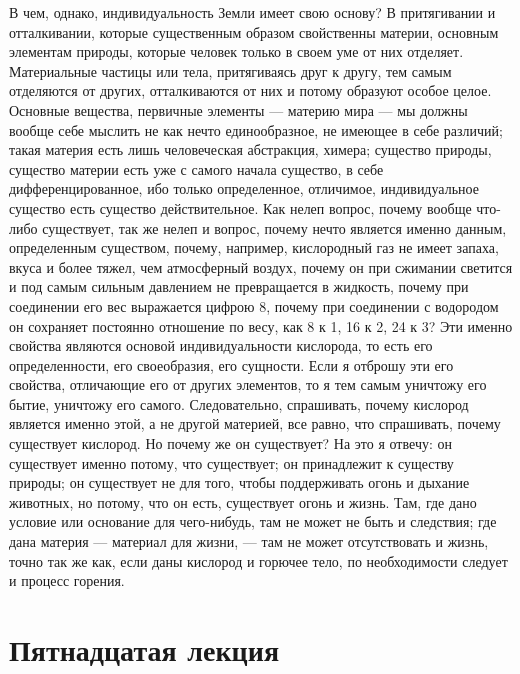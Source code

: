\documentclass[12pt]{article}
\begin{document}
В чем, однако, индивидуальность Земли имеет свою основу? В притягивании и отталкивании, которые существенным образом свойственны материи, основным элементам природы, которые человек только в своем уме от них отделяет. Материальные частицы или тела, притягиваясь друг к другу, тем самым отделяются от других, отталкиваются от них и потому образуют особое целое. Основные вещества, первичные элементы --- материю мира --- мы должны вообще себе мыслить не как нечто единообразное, не имеющее в себе различий; такая материя есть лишь человеческая абстракция, химера; существо природы, существо материи есть уже с самого начала существо, в себе дифференцированное, ибо только определенное, отличимое, индивидуальное существо есть существо действительное. Как нелеп вопрос, почему вообще что-либо существует, так же нелеп и вопрос, почему нечто является именно данным, определенным существом, почему, например, кислородный газ не имеет запаха, вкуса и более тяжел, чем атмосферный воздух, почему он при сжимании светится и под самым сильным давлением не превращается в жидкость, почему при соединении его вес выражается цифрою 8, почему при соединении с водородом он сохраняет постоянно отношение по весу, как 8 к 1, 16 к 2, 24 к 3? Эти именно свойства являются основой индивидуальности кислорода, то есть его определенности, его своеобразия, его сущности. Если я отброшу эти его свойства, отличающие его от других элементов, то я тем самым уничтожу его бытие, уничтожу его самого. Следовательно, спрашивать, почему кислород является именно этой, а не другой материей, все равно, что спрашивать, почему существует кислород. Но почему же он существует? На это я отвечу: он существует именно потому, что существует; он принадлежит к существу природы; он существует не для того, чтобы поддерживать огонь и дыхание животных, но потому, что он есть, существует огонь и жизнь. Там, где дано условие или основание для чего-нибудь, там не может не быть и следствия; где дана материя --- материал для жизни, --- там не может отсутствовать и жизнь, точно так же как, если даны кислород и горючее тело, по необходимости следует и процесс горения. 

{}
\section*{Пятнадцатая лекция}
\end{document}
